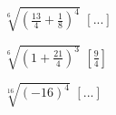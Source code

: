 \begin{esercizio}[\Ast]
\begin{multicols}{3}
\begin{enumeratea}
 \item $\sqrt[6]{\left(\frac{13} 4+\frac 1 8\right)^4}$
  \hfill $\left[...\right]$
 \item $\sqrt[6]{\left(1+\frac{21} 4\right)^3}$
  \hfill $\left[\frac 9 4\right]$
 \item $\sqrt[16]{(-16)^4}$
  \hfill $\left[...\right]$
 \end{enumeratea}
 \end{multicols}
\end{esercizio}

